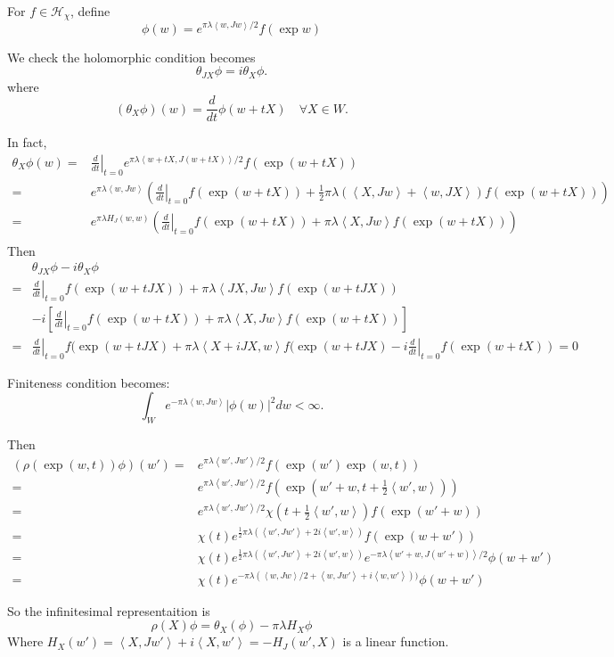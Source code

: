 \documentclass[12pt]{article}
\def\inn#1#2{\left\langle{#1},{#2}\right\rangle}
\def\abs#1{\left|{#1}\right|}
\def\chh{\mathcal{H}}
\def\ddt{\left.\frac{d}{dt}\right|_{t=0}}
\begin{document}
For $f\in \chh_\chi$, define
\[
\phi(w) = e^{\pi \lambda \inn{w}{Jw}/2} f(\exp w) 
\] 

We check the holomorphic condition becomes 
\[
\theta_{JX} \phi = i \theta_{X} \phi.
\]
where 
\[
(\theta_X \phi)(w) = \frac{d}{dt}\phi(w+tX) \quad \forall X\in W.
\]

In fact, 
\[
\begin{split}
\theta_X \phi(w) =& \ddt e^{\pi \lambda \inn{w+tX}{J(w+tX)}/2} f(\exp(w+tX))\\
= &  e^{\pi \lambda \inn{w}{Jw}}(\ddt f(\exp(w+tX)) 
+ \frac{1}{2}\pi\lambda (\inn{X}{Jw}+\inn{w}{JX}) f(\exp(w+tX))) \\
= &  e^{\pi \lambda H_J(w,w)}(\ddt f(\exp(w+tX)) + \pi\lambda \inn{X}{Jw} f(\exp(w+tX))) \\
\end{split}
\] 
Then 
\[
\begin{split}
&\theta_{JX}\phi - i\theta_{X}\phi \\
= & \ddt f(\exp(w+tJX)) + \pi\lambda \inn{JX}{Jw} f(\exp(w+tJX))\\
&-i \left[ \ddt f(\exp(w+tX)) + \pi\lambda \inn{X}{Jw} f(\exp(w+tX))\right]\\
=& \ddt f(\exp(w+tJX)  + \pi \lambda \inn{X+iJX}{w} f(\exp(w+tJX)
- i \ddt f(\exp(w+tX))= 0 
\end{split}
\]

Finiteness condition becomes:
\[
\int_W e^{-\pi \lambda \inn{w}{Jw}}\abs{\phi(w)}^2dw < \infty.
\]

Then
\[
\begin{split}
(\rho(\exp(w,t))\phi)(w') =& e^{\pi \lambda \inn{w'}{Jw'}/2} f(\exp(w') \exp(w,t))\\
=& e^{\pi \lambda \inn{w'}{Jw'}/2} f(\exp(w'+w,t+ \frac{1}{2}\inn{w'}{w}))\\
=& e^{\pi \lambda \inn{w'}{Jw'}/2} \chi(t+ \frac{1}{2}\inn{w'}{w}) f(\exp(w'+w))\\
=& \chi(t) e^{\frac{1}{2}\pi \lambda (\inn{w'}{Jw'}+2i \inn{w'}{w})}
 f(\exp(w+w')) \\
=& \chi(t) e^{\frac{1}{2}\pi \lambda (\inn{w'}{Jw'}+2i \inn{w'}{w})} 
e^{-\pi \lambda \inn{w'+w}{J(w'+w)}/2} \phi(w+w')\\
=& \chi(t) e^{-\pi \lambda (\inn{w}{Jw}/2+ \inn{w}{Jw'}+i\inn{w}{w'}))} 
 \phi(w+w') 
\end{split}
\]


So the infinitesimal representaition is 
\[
\rho(X) \phi = \theta_X(\phi) -\pi\lambda H_X \phi
\]
Where $H_X(w') =\inn{X}{Jw'} + i\inn{X}{w'} = -H_J(w',X)$ is a linear function.
\end{document}
